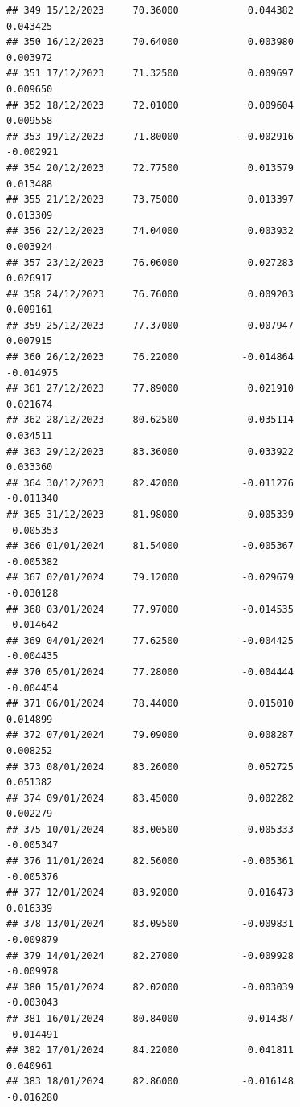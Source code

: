 \documentclass[
]{article}
\begin{document}
\begin{verbatim}
## 349 15/12/2023     70.36000            0.044382                0.043425
## 350 16/12/2023     70.64000            0.003980                0.003972
## 351 17/12/2023     71.32500            0.009697                0.009650
## 352 18/12/2023     72.01000            0.009604                0.009558
## 353 19/12/2023     71.80000           -0.002916               -0.002921
## 354 20/12/2023     72.77500            0.013579                0.013488
## 355 21/12/2023     73.75000            0.013397                0.013309
## 356 22/12/2023     74.04000            0.003932                0.003924
## 357 23/12/2023     76.06000            0.027283                0.026917
## 358 24/12/2023     76.76000            0.009203                0.009161
## 359 25/12/2023     77.37000            0.007947                0.007915
## 360 26/12/2023     76.22000           -0.014864               -0.014975
## 361 27/12/2023     77.89000            0.021910                0.021674
## 362 28/12/2023     80.62500            0.035114                0.034511
## 363 29/12/2023     83.36000            0.033922                0.033360
## 364 30/12/2023     82.42000           -0.011276               -0.011340
## 365 31/12/2023     81.98000           -0.005339               -0.005353
## 366 01/01/2024     81.54000           -0.005367               -0.005382
## 367 02/01/2024     79.12000           -0.029679               -0.030128
## 368 03/01/2024     77.97000           -0.014535               -0.014642
## 369 04/01/2024     77.62500           -0.004425               -0.004435
## 370 05/01/2024     77.28000           -0.004444               -0.004454
## 371 06/01/2024     78.44000            0.015010                0.014899
## 372 07/01/2024     79.09000            0.008287                0.008252
## 373 08/01/2024     83.26000            0.052725                0.051382
## 374 09/01/2024     83.45000            0.002282                0.002279
## 375 10/01/2024     83.00500           -0.005333               -0.005347
## 376 11/01/2024     82.56000           -0.005361               -0.005376
## 377 12/01/2024     83.92000            0.016473                0.016339
## 378 13/01/2024     83.09500           -0.009831               -0.009879
## 379 14/01/2024     82.27000           -0.009928               -0.009978
## 380 15/01/2024     82.02000           -0.003039               -0.003043
## 381 16/01/2024     80.84000           -0.014387               -0.014491
## 382 17/01/2024     84.22000            0.041811                0.040961
## 383 18/01/2024     82.86000           -0.016148               -0.016280

\end{verbatim}
\end{document}
